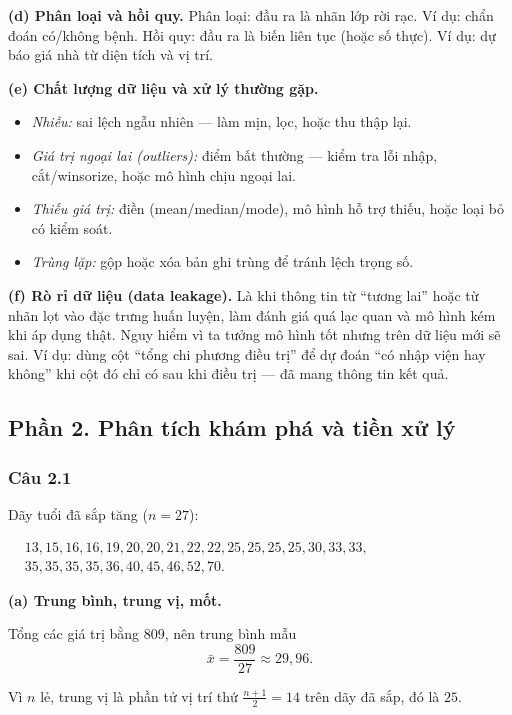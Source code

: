 \textbf{(d) Phân loại và hồi quy.} Phân loại: đầu ra là nhãn lớp rời rạc. Ví dụ: chẩn đoán có/không bệnh. Hồi quy: đầu ra là biến liên tục (hoặc số thực). Ví dụ: dự báo giá nhà từ diện tích và vị trí.

\textbf{(e) Chất lượng dữ liệu và xử lý thường gặp.}
\begin{itemize}
  \item \emph{Nhiễu:} sai lệch ngẫu nhiên --- làm mịn, lọc, hoặc thu thập lại.
  \item \emph{Giá trị ngoại lai (outliers):} điểm bất thường --- kiểm tra lỗi nhập, cắt/winsorize, hoặc mô hình chịu ngoại lai.
  \item \emph{Thiếu giá trị:} điền (mean/median/mode), mô hình hỗ trợ thiếu, hoặc loại bỏ có kiểm soát.
  \item \emph{Trùng lặp:} gộp hoặc xóa bản ghi trùng để tránh lệch trọng số.
\end{itemize}

\textbf{(f) Rò rỉ dữ liệu (data leakage).} Là khi thông tin từ ``tương lai'' hoặc từ nhãn lọt vào đặc trưng huấn luyện, làm đánh giá quá lạc quan và mô hình kém khi áp dụng thật. Nguy hiểm vì ta tưởng mô hình tốt nhưng trên dữ liệu mới sẽ sai. Ví dụ: dùng cột ``tổng chi phương điều trị'' để dự đoán ``có nhập viện hay không'' khi cột đó chỉ có sau khi điều trị --- đã mang thông tin kết quả.

\subsection*{Phần 2. Phân tích khám phá và tiền xử lý}

\subsubsection*{Câu 2.1}

Dãy tuổi đã sắp tăng ($n=27$):
\begin{center}
\small
$\begin{aligned}
&13,15,16,16,19,20,20,21,22,22,25,25,25,25,30,33,33,\\
&35,35,35,35,36,40,45,46,52,70.
\end{aligned}$
\end{center}

\textbf{(a) Trung bình, trung vị, mốt.}

Tổng các giá trị bằng $809$, nên trung bình mẫu
\[
\bar x=\frac{809}{27}\approx 29{,}96.
\]

Vì $n$ lẻ, trung vị là phần tử vị trí thứ $\frac{n+1}{2}=14$ trên dãy đã sắp, đó là $25$.

